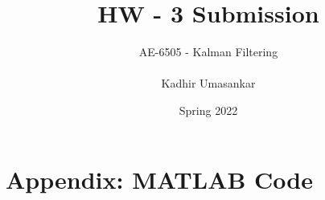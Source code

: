 \documentclass[12pt]{report}
\author{AE-6505 - Kalman Filtering \\\\ Kadhir Umasankar}
\title{HW - 3 Submission}
\date{Spring 2022}
\newlength{\originalVOffset}
\newlength{\originalHOffset}
\theoremstyle{definition}
\begin{document}
\maketitle

\setlength{\voffset}{-0.1cm}
\setlength{\hoffset}{-0.1cm}

\setlength{\voffset}{\originalVOffset}
\setlength{\hoffset}{\originalHOffset}

\section{Appendix: MATLAB Code}
\inputminted[linenos=true, breaklines=true, breakanywhere=true, fontsize=\scriptsize]{MATLAB}{../hw3.m}
\end{document}
